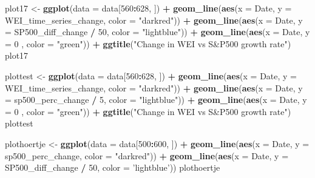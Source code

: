 \documentclass[]{article}
\newenvironment{Shaded}{\begin{snugshade}}{\end{snugshade}}
\newcommand{\KeywordTok}[1]{\textcolor[rgb]{0.13,0.29,0.53}{\textbf{#1}}}
\newcommand{\DataTypeTok}[1]{\textcolor[rgb]{0.13,0.29,0.53}{#1}}
\newcommand{\DecValTok}[1]{\textcolor[rgb]{0.00,0.00,0.81}{#1}}
\newcommand{\StringTok}[1]{\textcolor[rgb]{0.31,0.60,0.02}{#1}}
\newcommand{\OperatorTok}[1]{\textcolor[rgb]{0.81,0.36,0.00}{\textbf{#1}}}
\newcommand{\NormalTok}[1]{#1}
\begin{document}
\begin{Shaded}
\begin{Highlighting}[]
\NormalTok{plot17 <-}\StringTok{ }\KeywordTok{ggplot}\NormalTok{(}\DataTypeTok{data =}\NormalTok{ data[}\DecValTok{560}\OperatorTok{:}\DecValTok{628}\NormalTok{, ]) }\OperatorTok{+}\StringTok{ }
\StringTok{  }\KeywordTok{geom_line}\NormalTok{(}\KeywordTok{aes}\NormalTok{(}\DataTypeTok{x =}\NormalTok{ Date, }\DataTypeTok{y =}\NormalTok{ WEI_time_series_change, }\DataTypeTok{color =} \StringTok{"darkred"}\NormalTok{)) }\OperatorTok{+}\StringTok{ }
\StringTok{  }\KeywordTok{geom_line}\NormalTok{(}\KeywordTok{aes}\NormalTok{(}\DataTypeTok{x =}\NormalTok{ Date, }\DataTypeTok{y =}\NormalTok{ SP500_diff_change }\OperatorTok{/}\StringTok{ }\DecValTok{50}\NormalTok{, }\DataTypeTok{color =} \StringTok{"lightblue"}\NormalTok{)) }\OperatorTok{+}\StringTok{ }
\StringTok{  }\KeywordTok{geom_line}\NormalTok{(}\KeywordTok{aes}\NormalTok{(}\DataTypeTok{x =}\NormalTok{ Date, }\DataTypeTok{y =} \DecValTok{0}\NormalTok{ , }\DataTypeTok{color =} \StringTok{"green"}\NormalTok{)) }\OperatorTok{+}
\StringTok{  }\KeywordTok{ggtitle}\NormalTok{(}\StringTok{"Change in WEI vs S&P500 growth rate"}\NormalTok{)}
\NormalTok{plot17}

\NormalTok{plottest <-}\StringTok{ }\KeywordTok{ggplot}\NormalTok{(}\DataTypeTok{data =}\NormalTok{ data[}\DecValTok{560}\OperatorTok{:}\DecValTok{628}\NormalTok{, ]) }\OperatorTok{+}\StringTok{ }
\StringTok{  }\KeywordTok{geom_line}\NormalTok{(}\KeywordTok{aes}\NormalTok{(}\DataTypeTok{x =}\NormalTok{ Date, }\DataTypeTok{y =}\NormalTok{ WEI_time_series_change, }\DataTypeTok{color =} \StringTok{"darkred"}\NormalTok{)) }\OperatorTok{+}\StringTok{ }
\StringTok{  }\KeywordTok{geom_line}\NormalTok{(}\KeywordTok{aes}\NormalTok{(}\DataTypeTok{x =}\NormalTok{ Date, }\DataTypeTok{y =}\NormalTok{ sp500_perc_change }\OperatorTok{/}\StringTok{ }\DecValTok{5}\NormalTok{, }\DataTypeTok{color =} \StringTok{"lightblue"}\NormalTok{)) }\OperatorTok{+}\StringTok{ }
\StringTok{  }\KeywordTok{geom_line}\NormalTok{(}\KeywordTok{aes}\NormalTok{(}\DataTypeTok{x =}\NormalTok{ Date, }\DataTypeTok{y =} \DecValTok{0}\NormalTok{ , }\DataTypeTok{color =} \StringTok{"green"}\NormalTok{)) }\OperatorTok{+}
\StringTok{  }\KeywordTok{ggtitle}\NormalTok{(}\StringTok{"Change in WEI vs S&P500 growth rate"}\NormalTok{)}
\NormalTok{plottest}

\NormalTok{plothoertje <-}\StringTok{ }\KeywordTok{ggplot}\NormalTok{(}\DataTypeTok{data =}\NormalTok{ data[}\DecValTok{500}\OperatorTok{:}\DecValTok{600}\NormalTok{, ]) }\OperatorTok{+}\StringTok{ }
\StringTok{  }\KeywordTok{geom_line}\NormalTok{(}\KeywordTok{aes}\NormalTok{(}\DataTypeTok{x =}\NormalTok{ Date, }\DataTypeTok{y =}\NormalTok{ sp500_perc_change, }\DataTypeTok{color =} \StringTok{"darkred"}\NormalTok{)) }\OperatorTok{+}
\StringTok{  }\KeywordTok{geom_line}\NormalTok{(}\KeywordTok{aes}\NormalTok{(}\DataTypeTok{x =}\NormalTok{ Date, }\DataTypeTok{y =}\NormalTok{ SP500_diff_change }\OperatorTok{/}\StringTok{ }\DecValTok{50}\NormalTok{, }\DataTypeTok{color =} \StringTok{'lightblue'}\NormalTok{))}
\NormalTok{plothoertje}


\end{Highlighting}
\end{Shaded}
\end{document}
